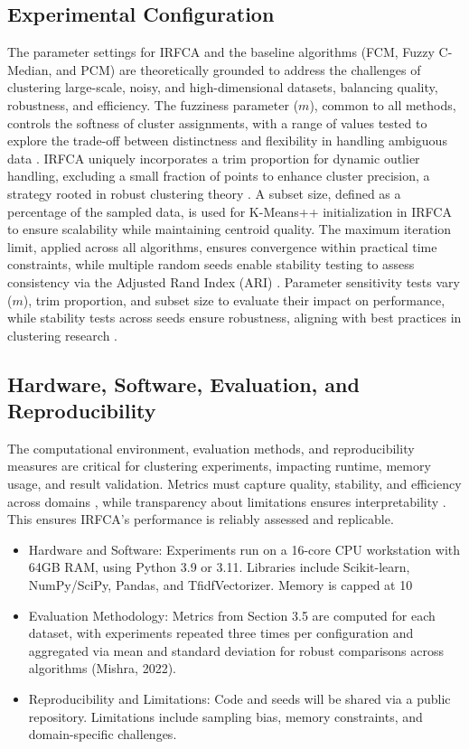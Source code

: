 \documentclass[twoside,11pt]{article}
\renewcommand{\cite}{\citep}
\begin{document}
\subsection{Experimental Configuration}
The parameter settings for IRFCA and the baseline algorithms (FCM, Fuzzy C-Median, and PCM) are theoretically grounded to address the challenges of clustering large-scale, noisy, and high-dimensional datasets, balancing quality, robustness, and efficiency. The fuzziness parameter ($m$), common to all methods, controls the softness of cluster assignments, with a range of values tested to explore the trade-off between distinctness and flexibility in handling ambiguous data \cite{bezdek1984}. IRFCA uniquely incorporates a trim proportion for dynamic outlier handling, excluding a small fraction of points to enhance cluster precision, a strategy rooted in robust clustering theory \cite{krishnapuram1993}. A subset size, defined as a percentage of the sampled data, is used for K-Means++ initialization in IRFCA to ensure scalability while maintaining centroid quality. The maximum iteration limit, applied across all algorithms, ensures convergence within practical time constraints, while multiple random seeds enable stability testing to assess consistency via the Adjusted Rand Index (ARI) \cite{hubert1985}. Parameter sensitivity tests vary ($m$), trim proportion, and subset size to evaluate their impact on performance, while stability tests across seeds ensure robustness, aligning with best practices in clustering research \cite{halko2011}.

\subsection{Hardware, Software, Evaluation, and Reproducibility}
The computational environment, evaluation methods, and reproducibility measures are critical for clustering experiments, impacting runtime, memory usage, and result validation. Metrics must capture quality, stability, and efficiency across domains \cite{wasim2024}, while transparency about limitations ensures interpretability \cite{tortarolo2023}. This ensures IRFCA’s performance is reliably assessed and replicable.
\begin{itemize}[nosep]
    \item Hardware and Software: Experiments run on a 16-core CPU workstation with 64GB RAM, using Python 3.9 or 3.11. Libraries include Scikit-learn, NumPy/SciPy, Pandas, and TfidfVectorizer. Memory is capped at 10%
    \item Evaluation Methodology: Metrics from Section 3.5 are computed for each dataset, with experiments repeated three times per configuration and aggregated via mean and standard deviation for robust comparisons across algorithms (Mishra, 2022).
    \item Reproducibility and Limitations: Code and seeds will be shared via a public repository. Limitations include sampling bias, memory constraints, and domain-specific challenges. 
\end{itemize}
\end{document}
